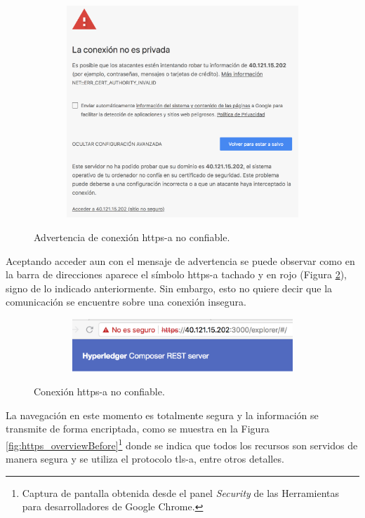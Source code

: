 \documentclass[12pt,a4paper, twoside]{report}
\begin{document}
		\begin{figure}[!ht]   
			\caption{Advertencia de conexión \gls{https-a} no confiable.} 
			\begin{center} 
				\includegraphics[width=15cm,height=8cm]{Images/installationManual/https/initialWarning.png} \\
				\label{fig:https_intialWarning} 
			\end{center}  
		\end{figure}
				
	Aceptando acceder aun con el mensaje de advertencia se puede observar como en la barra de direcciones aparece el símbolo \gls{https-a} tachado y en rojo (Figura \ref{fig:https_untrusted}), signo de lo indicado anteriormente. Sin embargo, esto no quiere decir que la comunicación se encuentre sobre una conexión insegura. \\
		
		\begin{figure}[!ht]   
			\caption{Conexión \gls{https-a} no confiable.} 
			\begin{center} 
				\includegraphics[width=12cm,height=2cm]{Images/installationManual/https/httpsUntrusted.png} \\
				\label{fig:https_untrusted} 
			\end{center}  
		\end{figure}
				
	La navegación en este momento es totalmente segura y la información se transmite de forma encriptada, como se muestra en la Figura \ref{fig:https_overviewBefore}\footnote{Captura de pantalla obtenida desde el panel \textit{Security} de las Herramientas para desarrolladores de Google Chrome.} donde se indica que todos los recursos son servidos de manera segura y se utiliza el protocolo \gls{tls-a}, entre otros detalles. 
	
\end{document}
